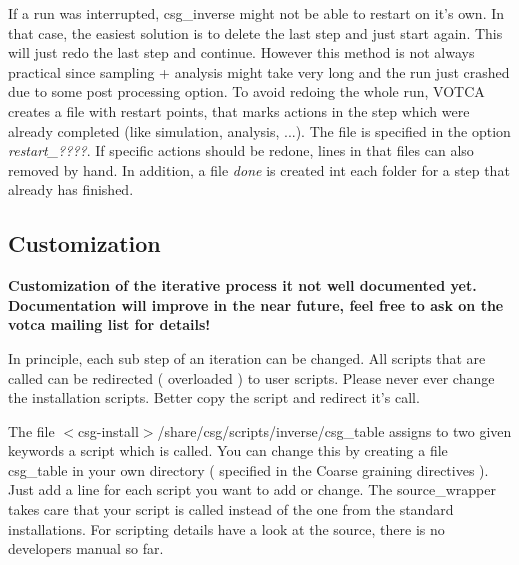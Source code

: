 If a run was interrupted, csg\_inverse might not be able to restart on it's own. In that case, the easiest solution is to delete the last step and just start again. This will just redo the last step and continue. However this method is not always practical since sampling + analysis might take very long and the run just crashed due to some post processing option. To avoid redoing the whole run, VOTCA creates a file with restart points, that marks actions in the step which were already completed (like simulation, analysis, ...). The file is specified in the option \textit{restart\_????}. If specific actions should be redone, lines in that files can also removed by hand. In addition, a file \textit{done} is created int each folder for a step that already has finished.

\subsection{Customization}
\textbf{Customization of the iterative process it not well documented yet. Documentation will improve in the near future, feel free to ask on the votca mailing list for details! }

In principle, each sub step of an iteration can be changed. All scripts that are called can be redirected ( overloaded ) to user scripts. Please never ever change the \votca installation scripts. Better copy the script and redirect it's call.

The file $<$csg-install$>$/share/csg/scripts/inverse/csg\_table assigns to two given keywords a script which is called. You can change this by creating a file
csg\_table in your own directory ( specified in the Coarse graining directives ). Just add a line for each script you want to add or change. The source\_wrapper takes care that your script is called instead of the one from the standard installations. For scripting details have a look at the source, there is no developers manual so far.